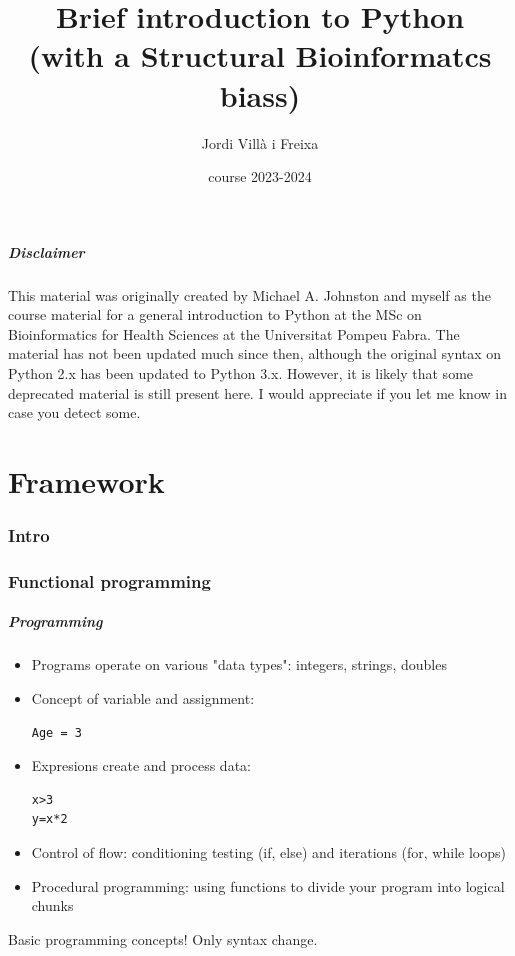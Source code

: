 \documentclass{beamer}
\title[Introduction]{Brief introduction to Python\\\small (with a Structural Bioinformatcs biass)} %
\author{Jordi Villà i Freixa} %
\institute[FCTE] %
{
Universitat de Vic - Universitat Central de Catalunya \\
Study Abroad\\ %
\medskip
\textit{jordi.villa@uvic.cat}\\ %
\copyright Michael A. Johnston 2007; JVF 2007-2023 
}
\date{course 2023-2024}
\begin{document}
\begin{frame}
  \titlepage %
\end{frame}

\begin{frame}
  \frametitle{Disclaimer}
  This material was originally created by Michael A. Johnston and myself as the course material for a general introduction to Python at the MSc on Bioinformatics for Health Sciences at the Universitat Pompeu Fabra. The material has not been updated much since then, although the original syntax on Python 2.x has been updated to Python 3.x. However, it is likely that some deprecated material is still present here. I would appreciate if you let me know in case you detect some. 
\end{frame}


\part{Framework}
\begin{frame}
\tableofcontents
\end{frame}

\section{Intro}
\section{Functional programming}

\begin{frame}[containsverbatim]
\frametitle{Programming}
\begin{itemize}
\item Programs operate on various "data types": integers, strings, doubles
\item Concept of variable and assignment: 
\begin{lstlisting}
Age = 3
\end{lstlisting}
\item Expresions create and process data:
\begin{lstlisting}
x>3
y=x*2
\end{lstlisting}
\item Control of flow: conditioning testing (if, else) and iterations (for, while loops)
\item Procedural programming: using functions to divide your program into logical chunks
\end{itemize}
Basic programming concepts! Only syntax change.
\end{frame}
\end{document}
